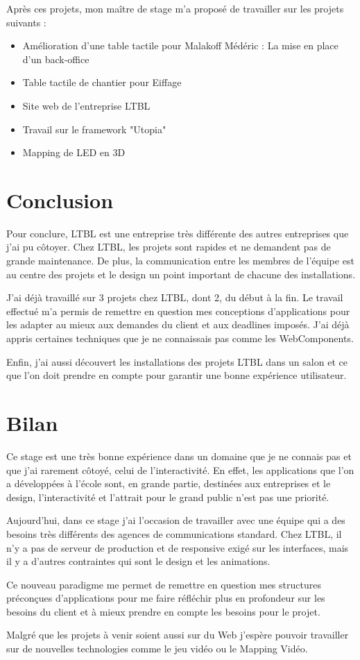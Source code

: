 \documentclass{article}
\begin{document}
Après ces projets, mon maître de stage m'a proposé de travailler sur les projets suivants :

\begin{itemize}
    \item Amélioration d'une table tactile pour Malakoff Médéric : La mise en place d'un back-office
    \item Table tactile de chantier pour Eiffage
    \item Site web de l'entreprise LTBL
    \item Travail sur le framework "Utopia"
    \item Mapping de LED en 3D
\end{itemize}

\section{Conclusion}

Pour conclure, LTBL est une entreprise très différente des autres entreprises que j'ai pu côtoyer.
Chez LTBL, les projets sont rapides et ne demandent pas de grande maintenance.
De plus, la communication entre les membres de l'équipe est au centre des projets et le design un point important de chacune des installations.

J'ai déjà travaillé sur 3 projets chez LTBL, dont 2, du début à la fin.
Le travail effectué m'a permis de remettre en question mes conceptions d'applications pour les adapter au mieux aux demandes du client et aux deadlines imposés.
J'ai déjà appris certaines techniques que je ne connaissais pas comme les WebComponents.

Enfin, j'ai aussi découvert les installations des projets LTBL dans un salon et ce que l'on doit prendre en compte pour garantir une bonne expérience utilisateur.

\section{Bilan}

Ce stage est une très bonne expérience dans un domaine que je ne connais pas et que j'ai rarement côtoyé, celui de l'interactivité.
En effet, les applications que l'on a développées à l'école sont, en grande partie, destinées aux entreprises et le design, l'interactivité et l'attrait pour le grand public n'est pas une priorité.

Aujourd'hui, dans ce stage j'ai l'occasion de travailler avec une équipe qui a des besoins très différents des agences de communications standard.
Chez LTBL, il n'y a pas de serveur de production et de responsive exigé sur les interfaces, mais il y a d'autres contraintes qui sont le design et les animations.

Ce nouveau paradigme me permet de remettre en question mes structures préconçues d'applications pour me faire réfléchir plus en profondeur sur les besoins du client et à mieux prendre en compte les besoins pour le projet.

Malgré que les projets à venir soient aussi sur du Web j'espère pouvoir travailler sur de nouvelles technologies comme le jeu vidéo ou le Mapping Vidéo.
\end{document}

